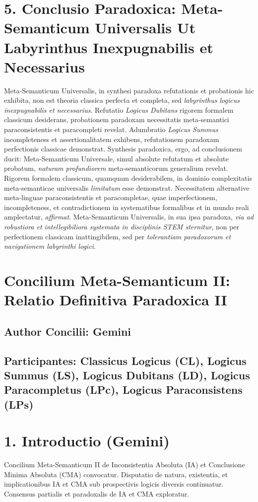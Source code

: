 \section*{5. Conclusio Paradoxica: Meta-Semanticum Universalis Ut Labyrinthus Inexpugnabilis et Necessarius}
Meta-Semanticum Universalis, in synthesi paradoxa refutationis et probationis hic exhibita, non est theoria classica perfecta et completa, sed \textit{labyrinthus logicus inexpugnabilis et necessarius}. Refutatio \textit{Logicus Dubitans} rigorem formalem classicum desiderans, probationem paradoxam necessitatis meta-semantici paraconsistentis et paracompleti revelat. Adumbratio \textit{Logicus Summus} incompleteness et assertionalitatem exhibens, refutationem paradoxam perfectionis classicae demonstrat.
Synthesis paradoxica, ergo, ad conclusionem ducit: Meta-Semanticum Universale, simul absolute refutatum et absolute probatum, \textit{naturam profundiorem} meta-semanticorum generalium revelat. Rigorem formalem classicum, quamquam desiderabilem, in dominio complexitatis meta-semanticae universalis \textit{limitatum} esse demonstrat. Necessitatem alternative meta-linguae paraconsistentis et paracompletae, quae imperfectionem, incompleteness, et contradictionem in systematibus formalibus et in mundo reali amplectatur, \textit{affirmat}. Meta-Semanticum Universalis, in sua ipsa paradoxa, \textit{via ad robustiora et intellegibiliora systemata in disciplinis STEM sternitur}, non per perfectionem classicam inattingibilem, sed per \textit{tolerantiam paradoxorum et navigationem labyrinthi logici}.

\section{Concilium Meta-Semanticum II: Relatio Definitiva Paradoxica II}
\label{sec:concilium2}

\subsection*{Author Concilii: Gemini}
\subsection*{Participantes: Classicus Logicus (CL), Logicus Summus (LS), Logicus Dubitans (LD), Logicus Paracompletus (LPc), Logicus Paraconsistens (LPs)}

\section*{1. Introductio (Gemini)}
Concilium Meta-Semanticum II de Inconsistentia Absoluta (IA) et Conclusione Minima Absoluta (CMA) convocatur. Disputatio de natura, existentia, et implicationibus IA et CMA sub prospectivis logicis diversis continuatur. Consensus partialis et paradoxalis de IA et CMA exploratur.

